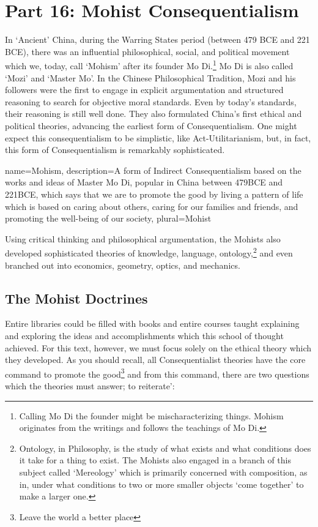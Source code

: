 \chapter{Part 16: Mohist Consequentialism}


In `Ancient' China, during the Warring States period (between 479 BCE and 221 BCE), there was an influential philosophical, social, and political movement which we, today, call `\gls{Mohism}' after its founder Mo Di.\footnote{Calling Mo Di the founder might be mischaracterizing things. Mohism originates from the writings and follows the teachings of Mo Di.} Mo Di is also called `Mozi' and `Master Mo'. In the Chinese Philosophical Tradition, Mozi and his followers were the first to engage in explicit argumentation and structured reasoning to search for objective moral standards. Even by today's standards, their reasoning is still well done. They also formulated China's first ethical and political theories, advancing the earliest form of Consequentialism. One might expect this consequentialism to be simplistic, like Act-Utilitarianism, but, in fact, this form of Consequentialism is remarkably sophisticated.

{
  name=Mohism,
  description={A form of Indirect Consequentialism based on the works and ideas of Master Mo Di, popular in China between 479BCE and 221BCE, which says that we are to promote the good by living a pattern of life which is based on caring about others, caring for our families and friends, and promoting the well-being of our society},
  plural=Mohist
}


Using critical thinking and philosophical argumentation, the Mohists also developed sophisticated theories of knowledge, language, ontology,\footnote{Ontology, in Philosophy, is the study of what exists and what conditions does it take for a thing to exist. The Mohists also engaged in a branch of this subject called `Mereology' which is primarily concerned with composition, as in, under what conditions to two or more smaller objects `come together' to make a larger one.} and even branched out into economics, geometry, optics, and mechanics.\autocite{sep-mohism}

\section{The Mohist Doctrines}

Entire libraries could be filled with books and entire courses taught explaining and exploring the ideas and accomplishments which this school of thought achieved. For this text, however, we must focus solely on the ethical theory which they developed. As you should recall, all Consequentialist theories have the core command to promote the good\footnote{Leave the world a better place} and from this command, there are two questions which the theories must answer; to reiterate':

